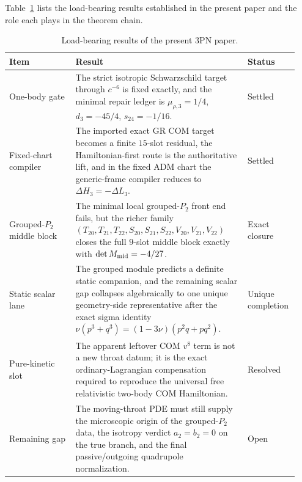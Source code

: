 \documentclass[11pt]{article}
\begin{document}
Table~\ref{tab:executive-ledger-3pn} lists the load-bearing results established
in the present paper and the role each plays in the theorem chain.

\begin{table}[t]
  \centering
  \caption{Load-bearing results of the present $3$PN paper.}
  \label{tab:executive-ledger-3pn}
  \footnotesize
  \setlength{\tabcolsep}{4pt}
  \renewcommand{\arraystretch}{1.12}
  \begin{tabular}{p{0.22\linewidth}p{0.58\linewidth}p{0.14\linewidth}}
    \hline
    Item & Result & Status \\
    \hline
    One-body gate
    & The strict isotropic Schwarzschild target through $c^{-6}$ is fixed exactly,
      and the minimal repair ledger is
      $\mu_{\rho,3}=1/4$, $d_3=-45/4$, $s_{24}=-1/16$.
    & Settled \\

    Fixed-chart compiler
    & The imported exact GR COM target becomes a finite $15$-slot residual, the
      Hamiltonian-first route is the authoritative lift, and in the fixed ADM
      chart the generic-frame compiler reduces to
      $\Delta H_3=-\Delta L_3$.
    & Settled \\

    Grouped-$P_2$ middle block
    & The minimal local grouped-$P_2$ front end fails, but the richer family
      $(T_{20},T_{21},T_{22},S_{20},S_{21},S_{22},V_{20},V_{21},V_{22})$
      closes the full $9$-slot middle block exactly with
      $\det M_{\rm mid}=-4/27$.
    & Exact closure \\

    Static scalar lane
    & The grouped module predicts a definite static companion, and the remaining
      scalar gap collapses algebraically to one unique geometry-side
      representative after the exact sigma identity
      $\nu(p^3+q^3)=(1-3\nu)(p^2q+pq^2)$.
    & Unique completion \\

    Pure-kinetic slot
    & The apparent leftover COM $v^8$ term is not a new throat datum; it is the
      exact ordinary-Lagrangian compensation required to reproduce the universal
      free relativistic two-body COM Hamiltonian.
    & Resolved \\

    Remaining gap
    & The moving-throat PDE must still supply the microscopic origin of the
      grouped-$P_2$ data, the isotropy verdict $a_2=b_2=0$ on the true branch,
      and the final passive/outgoing quadrupole normalization.
    & Open \\
    \hline
  \end{tabular}
\end{table}
\end{document}
